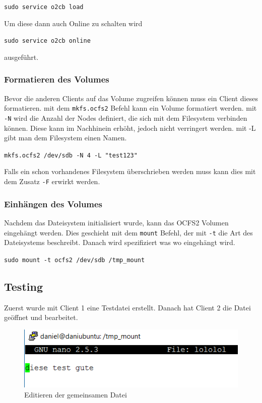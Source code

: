 \texttt{sudo service o2cb load}

Um diese dann auch Online zu schalten wird

\texttt{sudo service o2cb online}

ausgeführt. \cite{ocfs2faq}
\subsubsection{Formatieren des Volumes}
Bevor die anderen Clients auf das Volume zugreifen können muss ein Client dieses formatieren. 
mit dem \texttt{mkfs.ocfs2} Befehl kann ein Volume formatiert werden. mit \texttt{-N} wird die Anzahl der Nodes definiert, die sich mit dem Filesystem verbinden können. Diese kann im Nachhinein erhöht, jedoch nicht verringert werden. mit -L gibt man dem Filesystem einen Namen.

\texttt{mkfs.ocfs2 /dev/sdb -N 4 -L "test123"}

Falls ein schon vorhandenes Filesystem überschrieben werden muss kann dies mit dem Zusatz \texttt{-F} erwirkt werden. 

\subsubsection{Einhängen des Volumes}
Nachdem das Dateisystem initialisiert wurde, kann das OCFS2 Volumen eingehängt werden. Dies geschieht mit dem \texttt{mount} Befehl, der mit \texttt{-t} die Art des Dateisystems beschreibt. Danach wird spezifiziert was wo eingehängt wird. \cite{ocfs2faq}

\texttt{sudo mount -t ocfs2 /dev/sdb /tmp\_mount}

\subsection{Testing}
Zuerst wurde mit Client 1 eine Testdatei erstellt. Danach hat Client 2 die Datei geöffnet und bearbeitet.
\begin{figure}[!h]
	\begin{center}
		\includegraphics[width=0.5\linewidth]{images/edit.png}
		\caption{Editieren der gemeinsamen Datei}
		\label{edit}
	\end{center}
\end{figure}\

